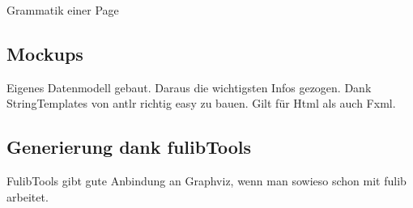 \begin{listing}[!ht]
    \inputminted[xleftmargin=20pt,linenos,firstnumber=23]{antlr}{listings/3.1/Page.g4}
    \caption{Grammatik einer Page}
    \label{listing:page}
\end{listing}




\subsection{Mockups}\label{subsec:mockups}
Eigenes Datenmodell gebaut.
Daraus die wichtigsten Infos gezogen.
Dank StringTemplates von antlr richtig easy zu bauen.
Gilt für Html als auch Fxml.

\subsection{Generierung dank fulibTools}\label{subsec:generierung-dank-fulibtools}
FulibTools gibt gute Anbindung an Graphviz, wenn man sowieso schon mit fulib arbeitet.
